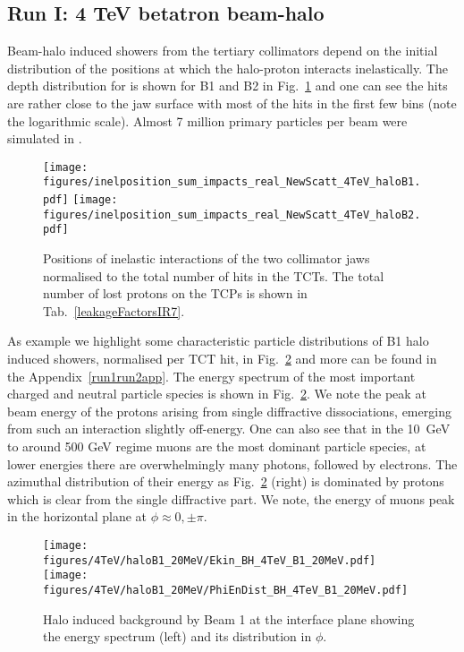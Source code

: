 \subsection{Run I: 4 TeV betatron beam-halo}

Beam-halo induced showers from the tertiary collimators depend on the initial distribution of the positions at which the halo-proton interacts inelastically.
The depth distribution for is shown for B1 and B2 in Fig.~\ref{inel4TeV} and one can see the hits are rather close to the jaw surface with most of the hits in the first few bins (note the logarithmic scale). Almost 7 million primary particles per beam were simulated in \fluka.

\begin{figure}[!htb]
\centering
\texttt{[image: figures/inelposition\_sum\_impacts\_real\_NewScatt\_4TeV\_haloB1.pdf]}
\texttt{[image: figures/inelposition\_sum\_impacts\_real\_NewScatt\_4TeV\_haloB2.pdf]}
 \caption{Positions of inelastic interactions of the two collimator jaws normalised to the total number of hits in the TCTs. The total number of lost protons on the TCPs is shown in Tab.~\ref{leakageFactorsIR7}.
  \label{inel4TeV}}
\end{figure}

As example we highlight some characteristic particle distributions of B1 halo induced showers, normalised per TCT hit, in Fig.~\ref{dist4TeVB1} and more can be found in the Appendix~\ref{run1run2app}. The energy spectrum of the most important charged and neutral particle species is shown in Fig.~\ref{dist4TeVB1}. We note the peak at beam energy of the protons arising from single diffractive dissociations, emerging from such an interaction slightly off-energy. One can also see that in the 10~GeV to around 500 GeV regime muons are the most dominant particle species, at lower energies there are overwhelmingly many photons, followed by electrons. The azimuthal distribution of their energy as Fig.~\ref{dist4TeVB1} (right) is dominated by protons which is clear from the single diffractive part. We note, the energy of muons peak in the horizontal plane at $\phi \approx 0, \pm \pi$. 

\begin{figure}%
\begin{center}
\texttt{[image: figures/4TeV/haloB1\_20MeV/Ekin\_BH\_4TeV\_B1\_20MeV.pdf]}
\texttt{[image: figures/4TeV/haloB1\_20MeV/PhiEnDist\_BH\_4TeV\_B1\_20MeV.pdf]}
\end{center}
\vspace{-0.6cm}
 \caption{Halo induced background by Beam 1 at the interface plane showing the energy spectrum (left) and its distribution in $\phi$.
  \label{dist4TeVB1}}
\end{figure}

